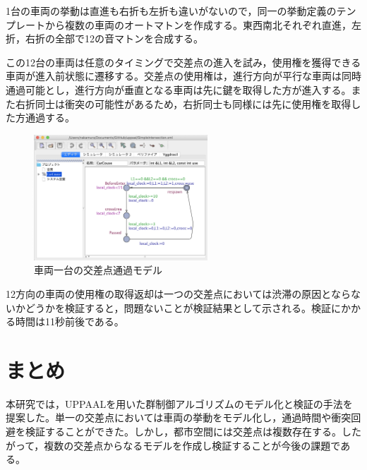 \documentclass[10pt]{tpu-abst-utf}
\begin{document}
1台の車両の挙動は直進も右折も左折も違いがないので，同一の挙動定義のテンプレートから複数の車両のオートマトンを作成する。東西南北それぞれ直進，左折，右折の全部で12の音マトンを合成する。

この12台の車両は任意のタイミングで交差点の進入を試み，使用権を獲得できる車両が進入前状態に遷移する。交差点の使用権は，進行方向が平行な車両は同時通過可能とし，進行方向が垂直となる車両は先に鍵を取得した方が進入する。また右折同士は衝突の可能性があるため，右折同士も同様には先に使用権を取得した方通過する。
\begin{figure}[htbp]
\centering
\includegraphics[width=65mm]{Simple.png}
\caption{車両一台の交差点通過モデル}
\label{Simple}
\end{figure}

12方向の車両の使用権の取得返却は一つの交差点においては渋滞の原因とならないかどうかを検証すると，問題ないことが検証結果として示される。検証にかかる時間は11秒前後である。
\section{まとめ}
本研究では，UPPAALを用いた群制御アルゴリズムのモデル化と検証の手法を提案した。単一の交差点においては車両の挙動をモデル化し，通過時間や衝突回避を検証することができた。しかし，都市空間には交差点は複数存在する。したがって，複数の交差点からなるモデルを作成し検証することが今後の課題である。
\begin{thebibliography}{1}
\end{thebibliography}
%
\end{document}
